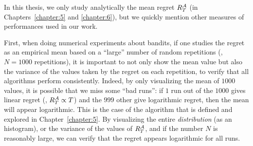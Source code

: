 In this thesis, we only study analytically the mean regret $R_T^{\mathcal{A}}$ (in Chapters~\ref{chapter:5} and \ref{chapter:6}), but we quickly mention other measures of performances used in our work.

First, when doing numerical experiments about bandits, if one studies the regret as an empirical mean based on a ``large'' number of random repetitions (\eg, $N=1000$ repetitions), it is important to not only show the mean value but also the variance of the values taken by the regret on each repetition, to verify that all algorithms perform consistently.
Indeed, by only visualizing the mean of $1000$ values, it is possible that we miss some ``bad runs'': if $1$ run out of the $1000$ gives linear regret (\ie, $R_T^{\mathcal{A}} \propto T$) and the $999$ other give logarithmic regret, then the mean will appear logarithmic.
This is the case of the \Selfish{} algorithm that is defined and explored in Chapter~\ref{chapter:5}.
By visualizing the entire \emph{distribution} (as an histogram), or the variance of the values of $R_T^{\mathcal{A}}$, and if the number $N$ is reasonably large, we can verify that the regret appears logarithmic for all runs.



